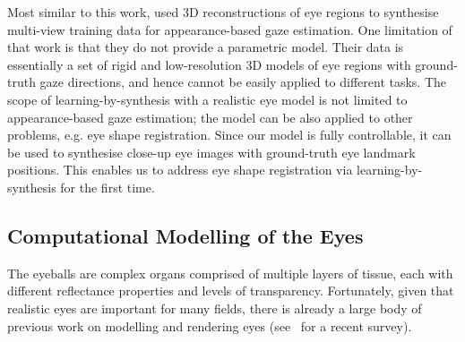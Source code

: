 Most similar to this work, \citet{sugano2014learning} used 3D reconstructions of eye regions to synthesise multi-view training data for appearance-based gaze estimation.
One limitation of that work is that they do not provide a parametric model.
Their data is essentially a set of rigid and low-resolution 3D models of eye regions with ground-truth gaze directions, and hence cannot be easily applied to different tasks.
The scope of learning-by-synthesis with a realistic eye model is not limited to appearance-based gaze estimation; the model can be also applied to other problems, e.g. eye shape registration.
Since our model is fully controllable, it can be used to synthesise close-up eye images with ground-truth eye landmark positions.
This enables us to address eye shape registration via learning-by-synthesis for the first time.



\subsection{Computational Modelling of the Eyes}



The eyeballs are complex organs comprised of multiple layers of tissue, each with different reflectance properties and levels of transparency.
Fortunately, given that realistic eyes are important for many fields, there is already a large body of previous work on modelling and rendering eyes (see~\cite{ruhland2014look} for a recent survey).

